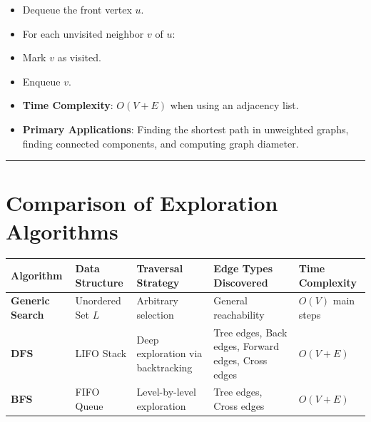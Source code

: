\documentclass[
]{book}
\newcounter{none} %
\theoremstyle{definition}
\theoremstyle{definition}
\theoremstyle{definition}
\theoremstyle{definition}
\theoremstyle{remark}
\begin{document}
\begin{itemize}
\item
  Dequeue the front vertex \(u\).
\item
  For each unvisited neighbor \(v\) of \(u\):
\item
  Mark \(v\) as visited.
\item
  Enqueue \(v\).
\item
  \textbf{Time Complexity}: \(O(V + E)\) when using an adjacency list.
\item
  \textbf{Primary Applications}: Finding the shortest path in unweighted graphs, finding connected components, and computing graph diameter.
\end{itemize}

\begin{center}\rule{0.5\linewidth}{0.5pt}\end{center}

\section{Comparison of Exploration Algorithms}\label{comparison-of-exploration-algorithms}

{\def\LTcaptype{none} %
\begin{longtable}[]{@{}
  >{\raggedright\arraybackslash}p{}
  >{\raggedright\arraybackslash}p{}
  >{\raggedright\arraybackslash}p{}
  >{\raggedright\arraybackslash}p{}
  >{\raggedright\arraybackslash}p{}@{}}
\toprule\noalign{}
\begin{minipage}[b]{\linewidth}\raggedright
Algorithm
\end{minipage} & \begin{minipage}[b]{\linewidth}\raggedright
Data Structure
\end{minipage} & \begin{minipage}[b]{\linewidth}\raggedright
Traversal Strategy
\end{minipage} & \begin{minipage}[b]{\linewidth}\raggedright
Edge Types Discovered
\end{minipage} & \begin{minipage}[b]{\linewidth}\raggedright
Time Complexity
\end{minipage} \\
\midrule\noalign{}
\endhead
\bottomrule\noalign{}
\endlastfoot
\textbf{Generic Search} & Unordered Set \(L\) & Arbitrary selection & General reachability & \(O(V)\) main steps \\
\textbf{DFS} & LIFO Stack & Deep exploration via backtracking & Tree edges, Back edges, Forward edges, Cross edges & \(O(V + E)\) \\
\textbf{BFS} & FIFO Queue & Level-by-level exploration & Tree edges, Cross edges & \(O(V + E)\) \\
\end{longtable}
}
\end{document}
